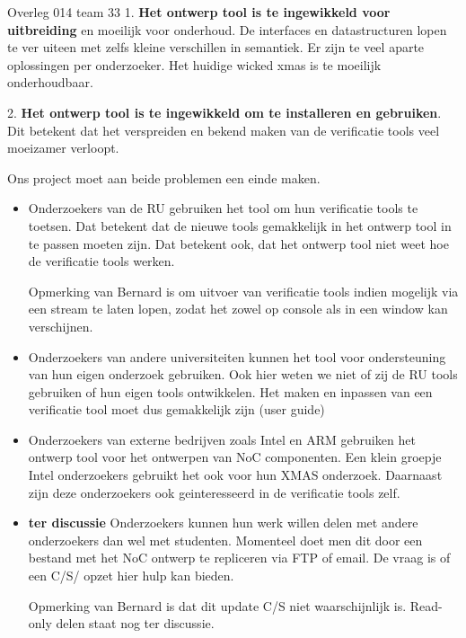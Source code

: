 \documentclass[a4paper,final]{article}
\begin{document}
\begin{Minutes}{Overleg 014 team 33}
1. {\bf Het ontwerp tool is te ingewikkeld voor uitbreiding} en moeilijk voor
onderhoud. De interfaces en datastructuren lopen te ver uiteen met zelfs kleine
verschillen in semantiek. Er zijn te veel aparte oplossingen per onderzoeker.
Het huidige wicked xmas is te moeilijk onderhoudbaar.

2. {\bf Het ontwerp tool is te ingewikkeld om te installeren en gebruiken}. Dit
betekent dat het verspreiden en bekend maken van de verificatie tools veel
moeizamer verloopt.

Ons project moet aan beide problemen een einde maken.


\begin{itemize}

	\item Onderzoekers van de RU gebruiken het tool om hun verificatie tools te
		toetsen. Dat betekent dat de nieuwe tools gemakkelijk in het ontwerp
		tool in te passen moeten zijn. Dat betekent ook, dat het ontwerp tool
		niet weet hoe de verificatie tools werken.

		Opmerking van Bernard is om uitvoer van verificatie tools indien
		mogelijk via een stream te laten lopen, zodat het zowel op console als
		in een window kan verschijnen.

	\item Onderzoekers van andere universiteiten kunnen het tool voor
		ondersteuning van hun eigen onderzoek gebruiken. Ook hier weten we niet
		of zij de RU tools gebruiken of hun eigen tools ontwikkelen. Het maken
		en inpassen van een verificatie tool moet dus gemakkelijk zijn (user
		guide)

	\item Onderzoekers van externe bedrijven zoals Intel en ARM gebruiken het
		ontwerp tool voor het ontwerpen van NoC componenten. Een klein groepje
		Intel onderzoekers gebruikt het ook voor hun XMAS onderzoek. Daarnaast
		zijn deze onderzoekers ook geinteresseerd in de verificatie tools zelf.

	\item {\bf ter discussie} Onderzoekers kunnen hun werk willen delen met
		andere onderzoekers dan wel met studenten. Momenteel doet men dit door
		een bestand met het NoC ontwerp te repliceren via FTP of email. De
		vraag is of een C/S/ opzet hier hulp kan bieden. 

		Opmerking van Bernard is dat dit update C/S niet waarschijnlijk is.
		Read-only delen staat nog ter discussie.


\end{itemize}
\end{Minutes}
\end{document}
